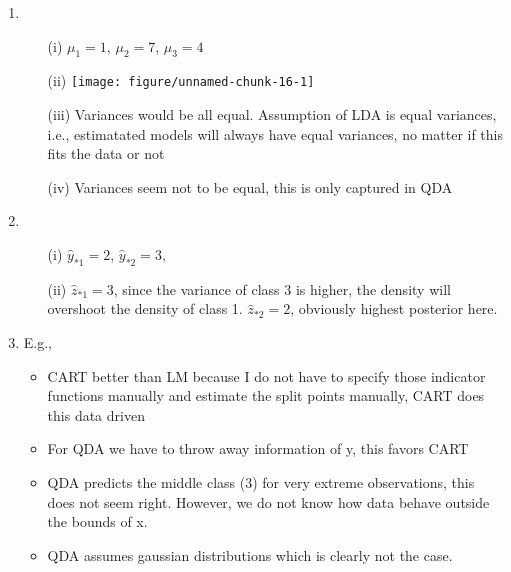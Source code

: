 \documentclass[a4paper]{article}
\makeatletter
\def\maxwidth{ %
  \ifdim\Gin@nat@width>\linewidth
    \linewidth
  \else
    \Gin@nat@width
  \fi
}
\newenvironment{knitrout}{}{} %
\newcounter{aufg}
\makeatother
\begin{document}
{{\begin{enumerate}
  \item \phantom{foo}
  \begin{enumerate}
    \item[(i)] $\mu_1 = 1$, $\mu_2 = 7$, $\mu_3 = 4$
    \item[(ii)] 
\begin{knitrout}
\color{fgcolor}
\texttt{[image: figure/unnamed-chunk-16-1]} 
\end{knitrout}
    \item[(iii)] Variances would be all equal. Assumption of LDA is equal 
    variances, i.e., estimatated models will always have equal variances, no 
    matter if this fits the data or not
    \item[(iv)] Variances seem not to be equal, this is only captured in QDA
  \end{enumerate}  
  \item \phantom{foo}
  \begin{enumerate}
    \item[(i)] $\hat{y}_{*1} = 2$, $\hat{y}_{*2} = 3$, 
    \item[(ii)] $\hat{z}_{*1} = 3$, since the variance of class 3 is higher, 
    the density will overshoot the density of class 1. 
    $\hat{z}_{*2} = 2$, obviously highest posterior here.
  \end{enumerate}
  \item E.g., 
  \begin{itemize}
    \item CART better than LM because I do not have to specify those indicator 
    functions manually and estimate the split points manually, CART does this 
    data driven
    \item For QDA we have to throw away information of y, this favors CART
    \item QDA predicts the middle class (3) for very extreme observations, this 
    does not seem right. However, we do not know how data behave outside the 
    bounds of x.
    \item QDA assumes gaussian distributions which is clearly not the case.
  \end{itemize}
\end{enumerate}

}


\dlz
{}}
\end{document}
